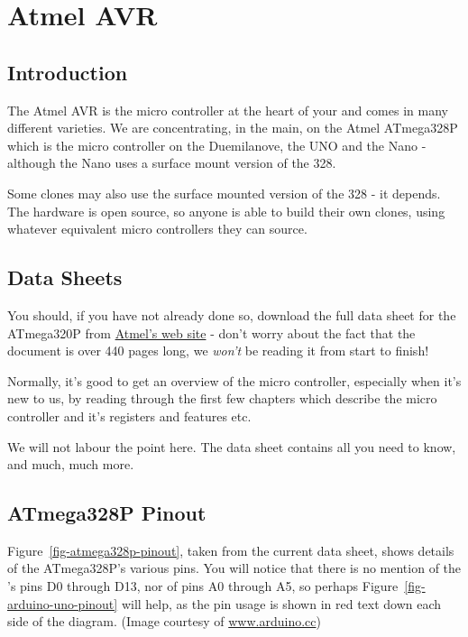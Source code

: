 \chapter{Atmel AVR}\label{atmel-avr}

\section{Introduction}\label{avr-introduction}

The Atmel AVR is the micro controller at the heart of your  and comes in many different varieties. We are concentrating, in the main, on the Atmel ATmega328P which is the micro controller on the Duemilanove, the UNO and the Nano - although the Nano uses a surface mount version of the 328.

Some clones may also use the surface mounted version of the 328 - it depends. The  hardware is open source, so anyone is able to build their own clones, using whatever equivalent micro controllers they can source.

\section{Data Sheets}\label{data-sheets}

You should, if you have not already done so, download the full data sheet for the ATmega320P from \href{http://www.atmel.com/Images/Atmel-42735-8-bit-AVR-Microcontroller-ATmega328-328P_Datasheet.pdf}{Atmel's web site} - don't worry about the fact that the document is over 440 pages long, we \emph{won't} be reading it from start to finish!

Normally, it's good to get an overview of the micro controller, especially when it's new to us, by reading  through the first few chapters which describe the micro controller and it's registers and features etc.

We will not labour the point here. The data sheet contains all you need to know, and much, much more. 

\section{ATmega328P Pinout}\label{atmega328p-pinout}
Figure~\ref{fig-atmega328p-pinout}, taken from the current data sheet,  shows details of the ATmega328P's various pins. You will notice that there is no mention of the 's pins D0 through D13, nor of pins A0 through A5, so perhaps Figure~\ref{fig-arduino-uno-pinout} will help, as the  pin usage is shown in red text down each side of the diagram. (Image courtesy of \href{https://www.arduino.cc/en/Hacking/PinMapping168}{www.arduino.cc})

